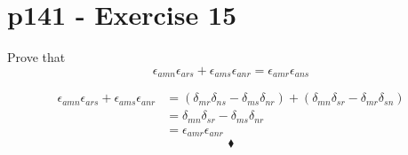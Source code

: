 \section{p141 - Exercise 15}
\begin{tcolorbox}
Prove that $$\epsilon_{amn}\epsilon_{ars}+\epsilon_{ams}\epsilon_{anr}=\epsilon_{amr}\epsilon_{ans}$$
\end{tcolorbox}
\begin{align}
\epsilon_{amn}\epsilon_{ars}+\epsilon_{ams}\epsilon_{anr}&=
\left(\delta_{mr}\delta_{ns}-\delta_{ms}\delta_{nr}\right)
+\left(\delta_{mn}\delta_{sr}-\delta_{mr}\delta_{sn}\right)\\
&=\delta_{mn}\delta_{sr}-\delta_{ms}\delta_{nr}\\
&=\epsilon_{amr}\epsilon_{anr}
\end{align}
$$\blacklozenge$$
\newpage